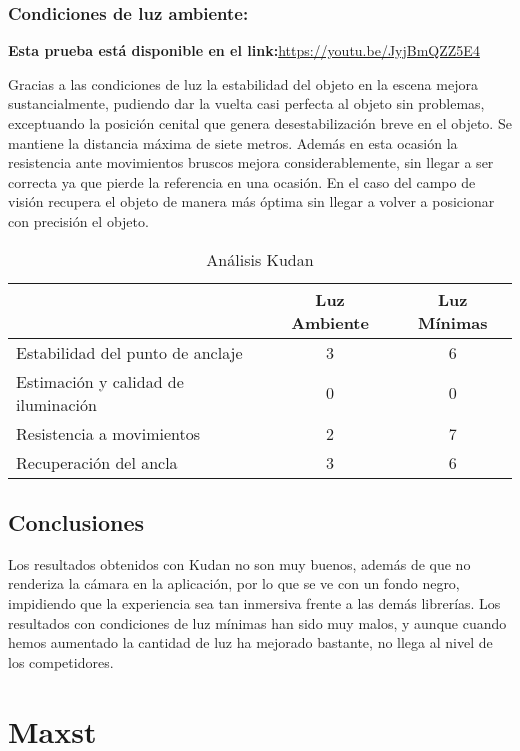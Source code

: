 \subsubsection{Condiciones de luz ambiente:}

\textbf{Esta prueba está disponible en el link:}\url{https://youtu.be/JyjBmQZZ5E4}

Gracias a las condiciones de luz la estabilidad del objeto en la escena mejora sustancialmente, pudiendo dar la vuelta casi perfecta al objeto sin problemas, exceptuando la posición cenital que genera desestabilización breve en el objeto. Se mantiene la distancia máxima de siete metros. Además en esta ocasión la resistencia ante movimientos bruscos mejora considerablemente, sin llegar a ser correcta ya que pierde la referencia en una ocasión. En el caso del campo de visión recupera el objeto de manera más óptima sin llegar a volver a posicionar con precisión el objeto.

\begin{table}[H]
    \centering
     \begin{tabular}{|l|c|c|}
    \hline
          & Luz Ambiente & Luz Mínimas \\
         \hline
        Estabilidad del punto de anclaje   &3 &6\\
        \hline
        Estimación y calidad de iluminación  &0 &0 \\
        \hline
        Resistencia a movimientos  &2 &7 \\
        \hline
        Recuperación del ancla  &3 &6 \\
      \hline
    \end{tabular}
  
    \caption{Análisis Kudan}
    \label{tab:TKudan}
\end{table}
\subsection{Conclusiones}
Los resultados obtenidos con Kudan no son muy buenos, además de que no renderiza la cámara en la aplicación, por lo que se ve con un fondo negro, impidiendo que la experiencia sea tan inmersiva frente a las demás librerías. Los resultados con condiciones de luz mínimas han sido muy malos, y aunque cuando hemos aumentado la cantidad de luz ha mejorado bastante, no llega al nivel de los competidores.
\clearpage
\section{Maxst}
